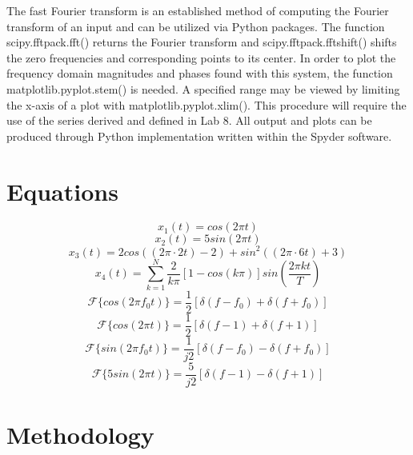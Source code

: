 \documentclass[12pt]{report}
\begin{document}
The fast Fourier transform is an established method of computing the Fourier transform of an input and can be utilized via Python packages. The function scipy.fftpack.fft() returns the Fourier transform and scipy.fftpack.fftshift() shifts the zero frequencies and corresponding points to its center. In order to plot the frequency domain magnitudes and phases found with this system, the function matplotlib.pyplot.stem() is needed. A specified range may be viewed by limiting the x-axis of a plot with matplotlib.pyplot.xlim(). This procedure will require the use of the series derived and defined in Lab 8. All output and plots can be produced through Python implementation written within the Spyder software. \\

\section{Equations}

\begin{equation}
	x_1(t) = cos(2\pi t)
\end{equation}
\begin{equation}
	x_2(t) = 5sin(2\pi t)
\end{equation}
\begin{equation}
	x_3(t) = 2cos((2\pi \cdot 2t) - 2) + sin^2((2\pi \cdot 6t) + 3)
\end{equation}
\begin{equation}
	x_4(t) = \sum_{k=1}^{N}\frac{2}{k\pi}[1 - cos(k\pi)]sin(\frac{2\pi kt}{T})
\end{equation}
\begin{equation*}
	\mathcal{F}\{cos(2\pi f_0t)\} = \frac{1}{2}[\delta(f - f_0) + \delta(f + f_0)]
\end{equation*}
\begin{equation}
	\mathcal{F}\{cos(2\pi t)\} = \frac{1}{2}[\delta(f - 1) + \delta(f + 1)]
\end{equation}
\begin{equation*}
	\mathcal{F}\{sin(2\pi f_0t)\} = \frac{1}{j2}[\delta(f - f_0) - \delta(f + f_0)]
\end{equation*}
\begin{equation}
	\mathcal{F}\{5sin(2\pi t)\} = \frac{5}{j2}[\delta(f - 1) - \delta(f + 1)]
\end{equation}

\section{Methodology}
\end{document}
